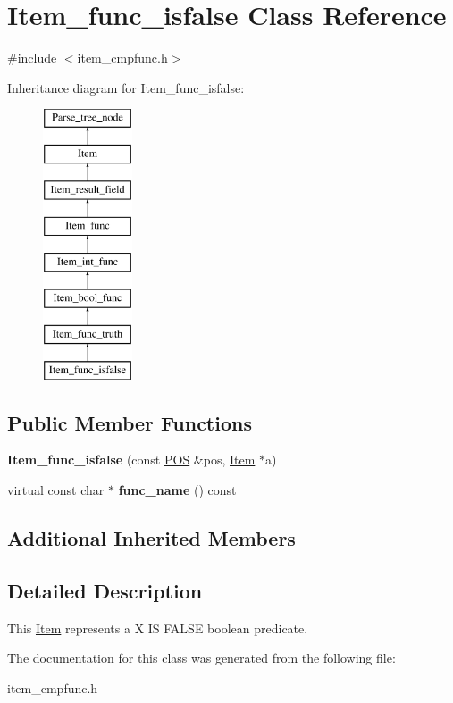 \hypertarget{classItem__func__isfalse}{}\section{Item\+\_\+func\+\_\+isfalse Class Reference}
\label{classItem__func__isfalse}


{\ttfamily \#include $<$item\+\_\+cmpfunc.\+h$>$}

Inheritance diagram for Item\+\_\+func\+\_\+isfalse\+:\begin{figure}[H]
\begin{center}
\leavevmode
\includegraphics[height=8.000000cm]{classItem__func__isfalse}
\end{center}
\end{figure}
\subsection*{Public Member Functions}
\begin{DoxyCompactItemize}
\item 
\mbox{\label{classItem__func__isfalse_abc2b7a3362b0b7149c8f9495fa37b15e}} 
{\bfseries Item\+\_\+func\+\_\+isfalse} (const \mbox{\hyperlink{structYYLTYPE}{P\+OS}} \&pos, \mbox{\hyperlink{classItem}{Item}} $\ast$a)
\item 
\mbox{\label{classItem__func__isfalse_a0951d7861f6fb45029a160cc306e4405}} 
virtual const char $\ast$ {\bfseries func\+\_\+name} () const
\end{DoxyCompactItemize}
\subsection*{Additional Inherited Members}


\subsection{Detailed Description}
This \mbox{\hyperlink{classItem}{Item}} represents a {\ttfamily X IS F\+A\+L\+SE} boolean predicate. 

The documentation for this class was generated from the following file\+:\begin{DoxyCompactItemize}
\item 
item\+\_\+cmpfunc.\+h\end{DoxyCompactItemize}
